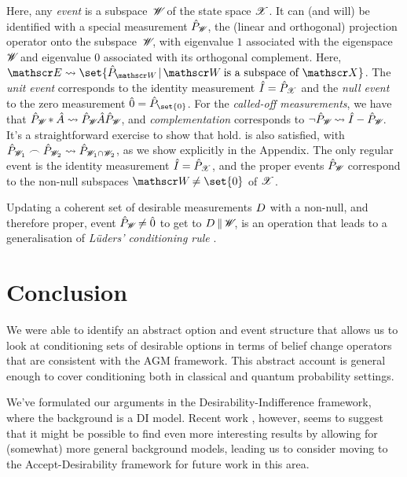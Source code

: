 \documentclass[preprint]{isipta2025}
\begin{document}
Here, any \emph{event} is a subspace~\(\subspace\) of the state space \(\hilbertspace\).
It can (and will) be identified with a special measurement \(\projector\), the (linear and orthogonal) projection operator onto the subspace~\(\subspace\), with eigenvalue \(1\) associated with the eigenspace \(\subspace\) and eigenvalue \(0\) associated with its orthogonal complement.
Here, \(\eventopts\instantiateas\set{\projector\given\subspace\text{ is a subspace of }\hilbertspace}\).
The \emph{unit event} corresponds to the identity measurement \(\identity=\projectoron{\hilbertspace}\) and the \emph{null event} to the zero measurement \(\zero=\projectoron{\set{0}}\).
For the \emph{called-off measurements}, we have that \(\projector\ast\measurement{A}\instantiateas\projector\measurement{A}\projector\), and \emph{complementation} corresponds to \(\neg\projector\instantiateas\identity-\projector\).
It's a straightforward exercise to show that  hold.
 is also satisfied, with \(\projector[1]\meet\projector[2]\instantiateas\projectoron{\subspace[1]\cap\subspace[2]}\), as we show explicitly in the Appendix.
The only regular event is the identity measurement \(\identity=\projectoron{\hilbertspace}\), and the proper events \(\projector\) correspond to the non-null subspaces \(\subspace\neq\set{0}\) of \(\hilbertspace\).

Updating a coherent set of desirable measurements \(\desirset\) with a non-null, and therefore proper, event \(\projector\neq\zero\) to get to \(\desirset\altcondon\subspace\), is an operation that leads to a generalisation of \emph{Lüders' conditioning rule} \cite{devos2025:isipta}.

\section{Conclusion}\label{sec::conclusion}
We were able to identify an abstract option and event structure that allows us to look at conditioning sets of desirable options in terms of belief change operators that are consistent with the AGM framework.
This abstract account is general enough to cover conditioning  both in classical and quantum probability settings.

We've formulated our arguments in the Desirability-Indifference framework, where the background is a DI model.
Recent work \cite{devos2025:isipta}, however, seems to suggest that it might be possible to find even more interesting results by allowing for (somewhat) more general background models, leading us to consider moving to the Accept-Desirability framework \cite{quaeghebeur2015:statement} for future work in this area.
\end{document}
